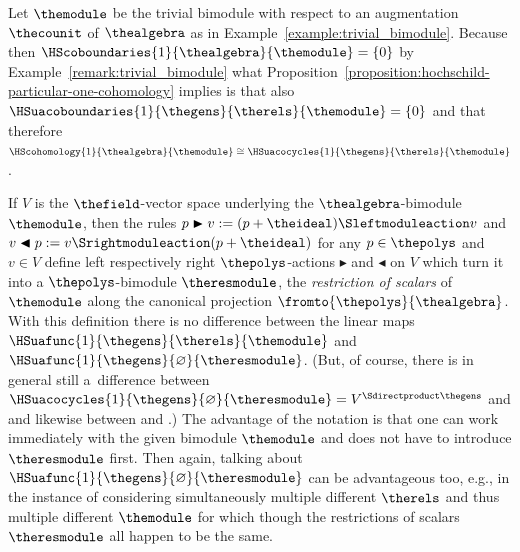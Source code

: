 \documentclass[pdftex]{sigma}
\numberwithin{equation}{section}
\begin{document}
{       {
  \newcommand{\anyscalar}{\lambda}
  \newcommand{\anypoly}{p}
  \newcommand{\anycoc}{\eta}
  \newcommand{\anygen}{e}
  \newcommand{\thetuple}{x}
  \newcommand{\thetuplex}[1]{\thetuple_{#1}}
  \begin{Example}
    \label{example:trivial_bimodule_conclusion}
Let $\themodule$ be the trivial bimodule with respect to an augmentation $\thecounit$ of $\thealgebra$ as in  Example~\ref{example:trivial_bimodule}.
    Because then $\HScoboundaries{1}{\thealgebra}{\themodule}=\{0\}$ by Example~\ref{remark:trivial_bimodule} what Pro\-po\-si\-tion~\ref{proposition:hochschild-particular-one-cohomology} implies is that also $\HSuacoboundaries{1}{\thegens}{\therels}{\themodule}=\{0\}$ and that therefore $\HScohomology{1}{\thealgebra}{\themodule}\cong \HSuacocycles{1}{\thegens}{\therels}{\themodule}$.
         \end{Example}
       }
       \begin{Remark}
         \label{remark:restriction_of_scalars}
         \newcommand{\thevectorspace}{V}
         \newcommand{\actleft}{\blacktriangleright}
         \newcommand{\actright}{\blacktriangleleft}
         \newcommand{\anypoly}{p}
         \newcommand{\anyrel}{r}
         \newcommand{\anyvector}{v}
         \newcommand{\thetuple}{x}
         If $\thevectorspace$ is the $\thefield$-vector space underlying the $\thealgebra$-bimodule $\themodule$, then the rules $\anypoly\actleft\anyvector:= (\anypoly+\theideal)\Sleftmoduleaction\anyvector$ and $\anyvector\actright\anypoly:= \anyvector\Srightmoduleaction(\anypoly+\theideal)$ for any $\anypoly\in\thepolys$ and $\anyvector\in\thevectorspace$ define  left respectively right $\thepolys$-actions $\actleft$ and $\actright$ on $\thevectorspace$ which turn it into a $\thepolys$-bimodule $\theresmodule$,  the \emph{restriction of scalars} of $\themodule$ along the canonical projection $\fromto{\thepolys}{\thealgebra}$. With this definition there is no difference between the linear maps $\HSuafunc{1}{\thegens}{\therels}{\themodule}$ and $\HSuafunc{1}{\thegens}{\varnothing}{\theresmodule}$. (But, of course, there is in general still a~difference between $\HSuacocycles{1}{\thegens}{\varnothing}{\theresmodule}=\thevectorspace^ {\Sdirectproduct\thegens}$ and \smash{$\HSuacocycles{1}{\thegens}{\therels}{\themodule}=\{\thetuple\in \thevectorspace^ {\Sdirectproduct\thegens}\Sand \forall \anyrel\in\therels\quantorpredicate \HSuafuncxx{1}{\thegens}{\varnothing}{\theresmodule}{\anyrel}{\thetuple}=0\}$} and likewise between  and .) The advantage of the notation  is that one can work immediately with the given bimodule $\themodule$ and does not have to introduce $\theresmodule$ first. Then again, talking about $\HSuafunc{1}{\thegens}{\varnothing}{\theresmodule}$ can be advantageous too, e.g., in the instance of considering  simultaneously multiple different $\therels$  and thus multiple different $\themodule$ for which though the restrictions of scalars~$\theresmodule$ all happen to be the same.
       \end{Remark}
     }
\end{document}
